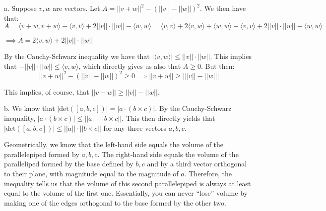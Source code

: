 \begin{solution}

    a. Suppose $v, w$ are vectors. Let $A = \lvert \lvert v + w \rvert \rvert^2 - (\lvert \lvert v \rvert \rvert - \lvert \lvert w \rvert \rvert)^2$. We then have that:
    $$A = \langle v + w, v + w \rangle - \langle v, v \rangle + 2 \lvert \lvert v \rvert \rvert  \cdot \lvert \lvert w \rvert \rvert - \langle w, w \rangle = \langle v, v \rangle + 2 \langle v, w \rangle + \langle w, w \rangle - \langle v, v \rangle + 2 \lvert \lvert v \rvert \rvert \cdot \lvert \lvert w \rvert \rvert - \langle w, w \rangle$$

    $\implies A = 2\langle v, w \rangle + 2 \lvert \lvert v \rvert \rvert \cdot \lvert \lvert w \rvert \rvert$

    By the Cauchy-Schwarz inequality we have that $\lvert \langle v, w \rangle \rvert \leq \lvert \lvert v \rvert \rvert \cdot \lvert \lvert w \rvert \rvert$. This implies that $-\lvert \lvert v \rvert \rvert \cdot \lvert \lvert w \rvert \rvert \leq \langle v, w \rangle$, which directly gives us also that $A \geq 0$. But then:
    $$\lvert \lvert v + w \rvert \rvert^2 - (\lvert \lvert v \rvert \rvert - \lvert \lvert w \rvert \rvert)^2 \geq 0 \implies \lvert \lvert v + w \rvert \rvert \geq \big \lvert \lvert \lvert v \rvert \rvert - \lvert \lvert w \rvert \rvert \big \rvert$$

    This implies, of course, that $\lvert \lvert v + w \rvert \rvert \geq \lvert \lvert v \rvert \rvert - \lvert \lvert w \rvert \rvert$.

    b. We know that $\lvert \text{det}([a, b, c]) \rvert = \lvert a \cdot (b \times c) \rvert$. By the Cauchy-Schwarz inequality, $\lvert a \cdot (b \times c) \rvert \leq \lvert \lvert a \rvert \rvert \cdot \lvert \lvert b \times c \rvert \rvert$. This then directly yields that $\lvert \text{det}([a, b, c]) \rvert \leq \lvert \lvert a \rvert \rvert \cdot \lvert \lvert b \times c \rvert \rvert$ for any three vectors $a, b, c$. 
    
    Geometrically, we know that the left-hand side equals the volume of the parallelepiped formed by $a, b, c$. The right-hand side equals the volume of the paralleliped formed by the base defined by $b, c$ and by a third vector orthogonal to their plane, with magnitude equal to the magnitude of $a$. Therefore, the inequality tells us that the volume of this second parallelepiped is always at least equal to the volume of the first one. Essentially, you can never ``lose'' volume by making one of the edges orthogonal to the base formed by the other two.
\end{solution}

